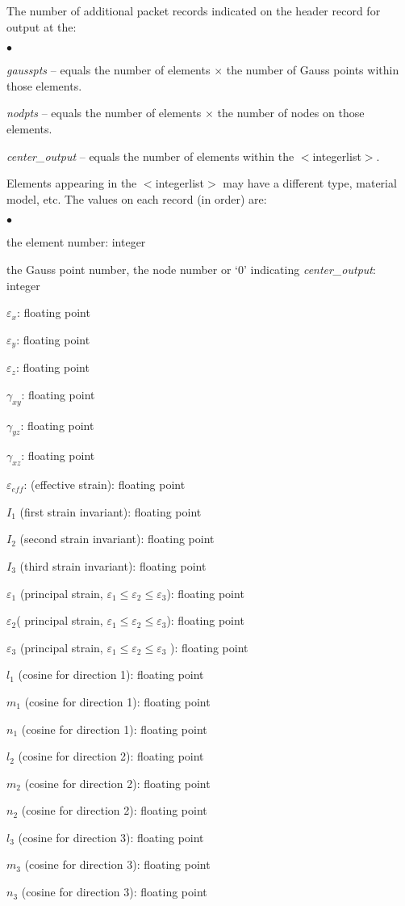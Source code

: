 \documentclass[10pt]{report}
\numberwithin{equation}{section}
\newcommand{\ti}{\emph}
\newcommand{\squishlist}{
 \begin{list}{$\bullet$}
  { \setlength{\itemsep}{0pt}
     \setlength{\parsep}{3pt}
     \setlength{\topsep}{3pt}
     \setlength{\partopsep}{0pt}
     \setlength{\leftmargin}{1.5em}
     \setlength{\labelwidth}{1em}
     \setlength{\labelsep}{0.5em} } }
\newcommand{\squishend}{
  \end{list}  }
\begin{document}
\noindent The number of additional packet records indicated on the 
header record for output at the:
\squishlist
\item \ti{gausspts} -- equals the number of elements $\times$ the 
number of Gauss points within those elements. 
\item \ti{nodpts} -- equals the number of elements $\times$ the number of 
nodes on those elements.
\item \ti{center\_output} -- equals the number of elements within 
the $<$integerlist$>$. 
\squishend
\noindent Elements appearing in the $<$integerlist$>$ may have 
a different type, material model, etc. The values on each record (in order) are:   
\squishlist
\item the element number:  integer
\item the Gauss point number, the node number or `0' indicating \ti{center\_output}:  integer
\item $\varepsilon_x$:  floating point
\item $\varepsilon_y$:  floating point
\item $\varepsilon_z$:  floating point
\item $\gamma_{xy}$:  floating point
\item $\gamma_{yz}$:  floating point
\item $\gamma_{xz}$:  floating point
\item $\varepsilon_{eff}$:  (effective strain):  floating point
\item $I_1$  (first strain invariant):  floating point
\item $I_2$  (second strain invariant):  floating point
\item $I_3$  (third strain invariant):  floating point
\item $\varepsilon_1$ (principal strain, $\varepsilon_1 \le \varepsilon_2 \le \varepsilon_3$):  floating point
\item $\varepsilon_2$( principal strain, $\varepsilon_1 \le \varepsilon_2 \le \varepsilon_3$):  floating point
\item $\varepsilon_3$ (principal strain, $\varepsilon_1 \le \varepsilon_2 \le \varepsilon_3$ ):  floating point
\item $l_1$ (cosine for direction 1):  floating point
\item $m_1$  (cosine for direction 1):  floating point
\item $n_1$  (cosine for direction 1):  floating point
\item $l_2$  (cosine for direction 2):  floating point
\item $m_2$  (cosine for direction 2):  floating point
\item $n_2$  (cosine for direction 2):  floating point
\item $l_3$  (cosine for direction 3):  floating point
\item $m_3$  (cosine for direction 3):  floating point
\item $n_3$  (cosine for direction 3):  floating point
\squishend
\end{document}
